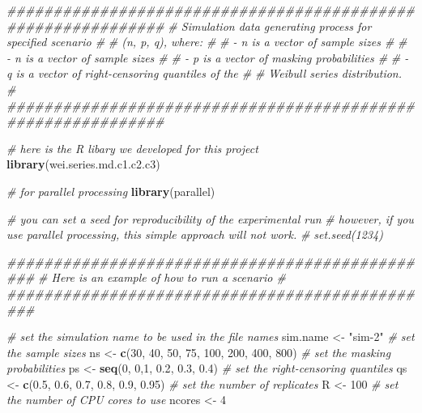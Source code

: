 \documentclass[
]{article}
\newenvironment{Shaded}{\begin{snugshade}}{\end{snugshade}}
\newcommand{\CommentTok}[1]{\textcolor[rgb]{0.56,0.35,0.01}{\textit{#1}}}
\newcommand{\DecValTok}[1]{\textcolor[rgb]{0.00,0.00,0.81}{#1}}
\newcommand{\FloatTok}[1]{\textcolor[rgb]{0.00,0.00,0.81}{#1}}
\newcommand{\KeywordTok}[1]{\textcolor[rgb]{0.13,0.29,0.53}{\textbf{#1}}}
\newcommand{\NormalTok}[1]{#1}
\newcommand{\StringTok}[1]{\textcolor[rgb]{0.31,0.60,0.02}{#1}}
\begin{document}
\begin{Shaded}
\begin{Highlighting}[]
\CommentTok{\#\#\#\#\#\#\#\#\#\#\#\#\#\#\#\#\#\#\#\#\#\#\#\#\#\#\#\#\#\#\#\#\#\#\#\#\#\#\#\#\#\#\#\#\#\#\#\#\#\#\#\#\#\#\#\#\#\#\#\#\#}
\CommentTok{\# Simulation data generating process for specified scenario \#}
\CommentTok{\# (n, p, q), where:                                         \#}
\CommentTok{\#    {-} n is a vector of sample sizes                        \#}
\CommentTok{\#     {-} n is a vector of sample sizes                       \#}
\CommentTok{\#     {-} p is a vector of masking probabilities              \#}
\CommentTok{\#     {-} q is a vector of right{-}censoring quantiles of the   \#}
\CommentTok{\#       Weibull series distribution.                        \#}
\CommentTok{\#\#\#\#\#\#\#\#\#\#\#\#\#\#\#\#\#\#\#\#\#\#\#\#\#\#\#\#\#\#\#\#\#\#\#\#\#\#\#\#\#\#\#\#\#\#\#\#\#\#\#\#\#\#\#\#\#\#\#\#\#}

\CommentTok{\# here is the R libary we developed for this project}
\KeywordTok{library}\NormalTok{(wei.series.md.c1.c2.c3) }

\CommentTok{\# for parallel processing}
\KeywordTok{library}\NormalTok{(parallel)}

\CommentTok{\# you can set a seed for reproducibility of the experimental run}
\CommentTok{\# however, if you use parallel processing, this simple approach will not work.}
\CommentTok{\# set.seed(1234)}

\CommentTok{\#\#\#\#\#\#\#\#\#\#\#\#\#\#\#\#\#\#\#\#\#\#\#\#\#\#\#\#\#\#\#\#\#\#\#\#\#\#\#\#\#\#\#\#\#\#\#}
\CommentTok{\# Here is an example of how to run a scenario \#}
\CommentTok{\#\#\#\#\#\#\#\#\#\#\#\#\#\#\#\#\#\#\#\#\#\#\#\#\#\#\#\#\#\#\#\#\#\#\#\#\#\#\#\#\#\#\#\#\#\#\#}

\CommentTok{\# set the simulation name to be used in the file names}
\NormalTok{sim.name \textless{}{-}}\StringTok{ "sim{-}2"}
\CommentTok{\# set the sample sizes}
\NormalTok{ns \textless{}{-}}\StringTok{ }\KeywordTok{c}\NormalTok{(}\DecValTok{30}\NormalTok{, }\DecValTok{40}\NormalTok{, }\DecValTok{50}\NormalTok{, }\DecValTok{75}\NormalTok{, }\DecValTok{100}\NormalTok{, }\DecValTok{200}\NormalTok{, }\DecValTok{400}\NormalTok{, }\DecValTok{800}\NormalTok{)}
\CommentTok{\# set the masking probabilities}
\NormalTok{ps \textless{}{-}}\StringTok{ }\KeywordTok{seq}\NormalTok{(}\DecValTok{0}\NormalTok{, }\DecValTok{0}\NormalTok{,}\DecValTok{1}\NormalTok{, }\FloatTok{0.2}\NormalTok{, }\FloatTok{0.3}\NormalTok{, }\FloatTok{0.4}\NormalTok{)}
\CommentTok{\# set the right{-}censoring quantiles}
\NormalTok{qs \textless{}{-}}\StringTok{ }\KeywordTok{c}\NormalTok{(}\FloatTok{0.5}\NormalTok{, }\FloatTok{0.6}\NormalTok{, }\FloatTok{0.7}\NormalTok{, }\FloatTok{0.8}\NormalTok{, }\FloatTok{0.9}\NormalTok{, }\FloatTok{0.95}\NormalTok{)}
\CommentTok{\# set the number of replicates}
\NormalTok{R \textless{}{-}}\StringTok{ }\DecValTok{100}
\CommentTok{\# set the number of CPU cores to use}
\NormalTok{ncores \textless{}{-}}\StringTok{ }\DecValTok{4}


\end{Highlighting}
\end{Shaded}
\end{document}
